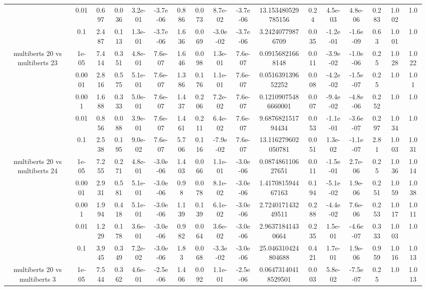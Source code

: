 \begin{tabular}{|c|c|c|c|c|c|c|c|c|c|c|c|c|c|c|c|c|}
 & 0.01 & 0.697 & 0.036 & 3.2e-01 & -3.7e-06 & 0.886 & 0.073 & 8.7e-02 & -3.7e-06 & 13.153480529785156 & 0.24 & 4.5e-03 & 4.8e-06 & 0.283 & 1.002 & 1.0 \\
 & 0.1 & 2.487 & 0.113 & 1.3e-01 & -3.7e-06 & 1.636 & 0.069 & -3.0e-02 & -3.7e-06 & 3.24240779876709 & 0.035 & -1.2e-01 & -1.6e-09 & 0.63 & 1.001 & 1.0 \\
\hline
\multirow{5}{*}{multiberts 20 vs multiberts 23} & 1e-05 & 7.414 & 0.351 & 4.8e-01 & 7.6e-07 & 1.646 & 0.098 & 1.3e-01 & 7.6e-07 & 0.09156821668148 & 0.011 & -3.9e-02 & -1.0e-06 & 0.25 & 1.028 & 1.022 \\
 & 0.0001 & 2.816 & 0.575 & 5.1e-01 & 7.6e-07 & 1.386 & 0.176 & 1.1e-01 & 7.6e-07 & 0.051639139652252 & 0.008 & -4.2e-02 & -1.5e-07 & 0.25 & 1.0 & 1.01 \\
 & 0.001 & 1.688 & 0.333 & 5.0e-01 & 7.6e-07 & 1.437 & 0.206 & 7.2e-02 & 7.6e-07 & 0.12109075486660001 & 0.007 & -9.4e-02 & -4.8e-06 & 0.252 & 1.0 & 1.0 \\
 & 0.01 & 0.856 & 0.088 & 3.9e-01 & 7.6e-07 & 1.461 & 0.211 & 6.4e-02 & 7.6e-07 & 9.687682151794434 & 0.053 & -1.1e-01 & -3.6e-07 & 0.297 & 1.034 & 1.0 \\
 & 0.1 & 2.538 & 0.195 & 9.0e-02 & 7.6e-07 & 5.706 & 0.116 & -7.9e-02 & 7.6e-07 & 13.116279602050781 & 0.051 & 1.3e-02 & -1.1e-07 & 2.81 & 1.003 & 1.031 \\
\hline
\multirow{5}{*}{multiberts 20 vs multiberts 24} & 1e-05 & 7.255 & 0.271 & 4.8e-01 & -3.0e-06 & 1.403 & 0.066 & 1.1e-01 & -3.0e-06 & 0.087486110627651 & 0.011 & -1.5e-01 & 2.7e-06 & 0.25 & 1.036 & 1.014 \\
 & 0.0001 & 2.931 & 0.581 & 5.1e-01 & -3.0e-06 & 0.98 & 0.078 & 8.1e-02 & -3.0e-06 & 1.417081594467163 & 0.194 & -5.1e-02 & 1.9e-06 & 0.251 & 1.059 & 1.038 \\
 & 0.001 & 1.994 & 0.418 & 5.1e-01 & -3.0e-06 & 1.139 & 0.139 & 6.1e-02 & -3.0e-06 & 2.724017143249511 & 0.288 & -4.4e-02 & 7.6e-06 & 0.253 & 1.017 & 1.011 \\
 & 0.01 & 1.229 & 0.178 & 3.6e-01 & -3.0e-06 & 0.982 & 0.064 & 3.6e-02 & -3.0e-06 & 2.96371841430664 & 0.235 & 1.5e-01 & -4.6e-07 & 0.333 & 1.003 & 1.0 \\
 & 0.1 & 3.945 & 0.349 & 7.2e-02 & -3.0e-06 & 1.83 & 0.068 & -3.3e-02 & -3.0e-06 & 25.046310424804688 & 0.421 & 1.7e-01 & 1.9e-06 & 0.959 & 1.016 & 1.013 \\
\hline
\multirow{5}{*}{multiberts 20 vs multiberts 3} & 1e-05 & 7.544 & 0.362 & 4.6e-01 & -2.5e-06 & 1.406 & 0.092 & 1.1e-01 & -2.5e-06 & 0.06473140418529501 & 0.003 & 5.8e-02 & -7.5e-07 & 0.25 & 1.0 & 1.013 \\

\end{tabular}
